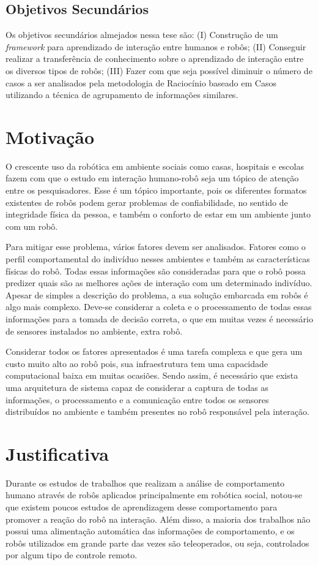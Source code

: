 \subsection{Objetivos Secundários}
Os objetivos secundários almejados nessa tese são: (I) Construção de um \emph{framework} para aprendizado de interação entre humanos e robôs; (II) Conseguir realizar a transferência de conhecimento sobre o aprendizado de interação entre os diversos tipos de robôs; (III) Fazer com que seja possível diminuir o número de casos a ser analisados pela metodologia de Raciocínio baseado em Casos utilizando a técnica de agrupamento de informações similares.

\section{Motivação}
O crescente uso da robótica em ambiente sociais como casas, hospitais e escolas fazem com que o estudo em interação humano-robô seja um tópico de atenção entre os pesquisadores. Esse é um tópico importante, pois os diferentes formatos existentes de robôs podem gerar problemas de confiabilidade, no sentido de integridade física da pessoa, e também o conforto de estar em um ambiente junto com um robô.

Para mitigar esse problema, vários fatores devem ser analisados. Fatores como o perfil comportamental do indivíduo nesses ambientes e também as características físicas do robô. Todas essas informações são consideradas para que o robô possa predizer quais são as melhores ações de interação com um determinado indivíduo. Apesar de simples a descrição do problema, a sua solução embarcada em robôs é algo mais complexo. Deve-se considerar a coleta e o processamento de todas essas informações para a tomada de decisão correta, o que em muitas vezes é necessário de sensores instalados no ambiente, extra robô.

Considerar todos os fatores apresentados é uma tarefa complexa e que gera um custo muito alto ao robô pois, sua infraestrutura tem uma capacidade computacional baixa em muitas ocasiões. Sendo assim, é necessário que exista uma arquitetura de sistema capaz de considerar a captura de todas as informações, o processamento e a comunicação entre todos os sensores distribuídos no ambiente e também presentes no robô responsável pela interação.

\section{Justificativa}
Durante os estudos de trabalhos que realizam a análise de comportamento humano através de robôs aplicados principalmente em robótica social, notou-se que existem poucos estudos de aprendizagem desse comportamento para promover a reação do robô na interação. Além disso, a maioria dos trabalhos não possui uma alimentação automática das informações de comportamento, e os robôs utilizados em grande parte das vezes são teleoperados, ou seja, controlados por algum tipo de controle remoto.

